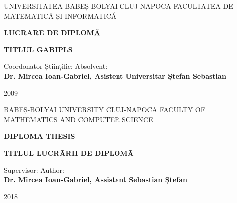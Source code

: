\documentclass[12pt]{report}
\begin{document}
	
	\begin{titlepage}
		
		\begin{center}
			\Large{{UNIVERSITATEA BABEȘ-BOLYAI CLUJ-NAPOCA}}
			\Large{{FACULTATEA DE MATEMATICĂ ȘI INFORMATICĂ}}
			
			\vspace{8cm}
			
			\textbf{LUCRARE DE DIPLOMÃ}
			
			\vspace{1cm}
			\Huge\textbf{{TITLUL GABIPLS}}
			\fontsize{12}{14}
			
		\end{center}
		\vspace{6cm}
		
		\hspace*{0.8cm}Coordonator  Științific: \hfill  Absolvent: \hspace*{0.8cm} \\    
		\textbf{Dr. Mircea Ioan-Gabriel, Asistent Universitar \hfill  \textbf{Ștefan Sebastian}}
		
		\vspace{2cm}
		\begin{center}
			\Large{2009}
		\end{center}
	\end{titlepage}
	
	\begin{titlepage}
		
		\begin{center}
			\Large{{BABEȘ-BOLYAI UNIVERSITY CLUJ-NAPOCA}}
			\newline
			\Large{{FACULTY OF MATHEMATICS AND COMPUTER SCIENCE}}
			
			\vspace{8cm}
			
			\textbf{DIPLOMA THESIS}
			
			\vspace{1cm}
			\Huge\textbf{{TITLUL LUCRÃRII DE DIPLOMÃ}}
			\fontsize{12}{14}
			
		\end{center}
		\vspace{6cm}
		
		\hspace*{0.8cm}Supervisor: \hfill  Author: \hspace*{0.8cm} \\    
		\textbf{Dr. Mircea Ioan-Gabriel, Assistant \hfill  \textbf{Sebastian Ștefan}}
		
		\vspace{2cm}
		\begin{center}
			\Large{2018}
		\end{center}
	\end{titlepage}
\end{document}
